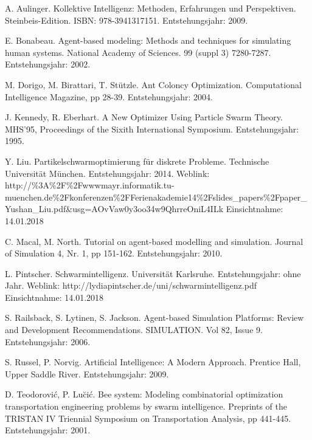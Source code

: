 \documentclass[a4paper, 11pt]{article}
\newcounter{pos}
\begin{document}
\begin{thebibliography}{sotief}
	A. Aulinger. Kollektive Intelligenz: Methoden, Erfahrungen und Perspektiven. Steinbeis-Edition. ISBN: 978-3941317151. Entstehungsjahr: 2009.	

	E. Bonabeau. Agent-based modeling: Methods and techniques for simulating human systems. National Academy of Sciences. 99 (suppl 3) 7280-7287. Entstehungsjahr: 2002.
	
	M. Dorigo, M. Birattari, T. Stützle. Ant Coloncy Optimization. Computational Intelligence Magazine, pp 28-39. Entstehungsjahr: 2004.
	
	J. Kennedy, R. Eberhart. A New Optimizer Using Particle Swarm Theory. MHS'95, Proceedings of the Sixith International Symposium. Entstehungsjahr: 1995.
	
	Y. Liu. Partikelschwarmoptimierung für diskrete Probleme. Technische Universität München. Entstehungsjahr: 2014.\newline\newline
	Weblink: http://\%3A\%2F\%2Fwwwmayr.informatik.tu-muenchen.de\%2Fkonferenzen\newline\%2FFerienakademie14\%2Fslides\_papers\%2Fpaper\_Yushan\_Liu.pdf\&usg=\newline AOvVaw0y3oo34w9QhrreOniL4ILk \newline Einsichtnahme: 14.01.2018
	
	C. Macal, M. North. Tutorial on agent-based modelling and simulation. Journal of Simulation 4, Nr. 1, pp 151-162. Entstehungsjahr: 2010.
	
	L. Pintscher. Schwarmintelligenz. Universität Karlsruhe. Entstehungsjahr: ohne Jahr.\newline\newline
	Weblink: http://lydiapintscher.de/uni/schwarmintelligenz.pdf \newline Einsichtnahme: 14.01.2018
	
	S. Railsback, S. Lytinen, S. Jackson. Agent-based Simulation Platforms: Review and Development Recommendations. SIMULATION. Vol 82, Issue 9. Entstehungsjahr: 2006.
	
	S. Russel, P. Norvig. Artificial Intelligence: A Modern Approach. Prentice Hall, Upper Saddle River. Entstehungsjahr: 2009.
	
	 D. Teodorovi\'{c}, P. Lu\u{c}i\'{c}. Bee system: Modeling combinatorial optimization transportation engineering problems by swarm intelligence. Preprints of the TRISTAN IV Triennial Symposium on Transportation Analysis, pp 441-445. Entstehungsjahr: 2001.
	

\end{thebibliography}
\end{document}

